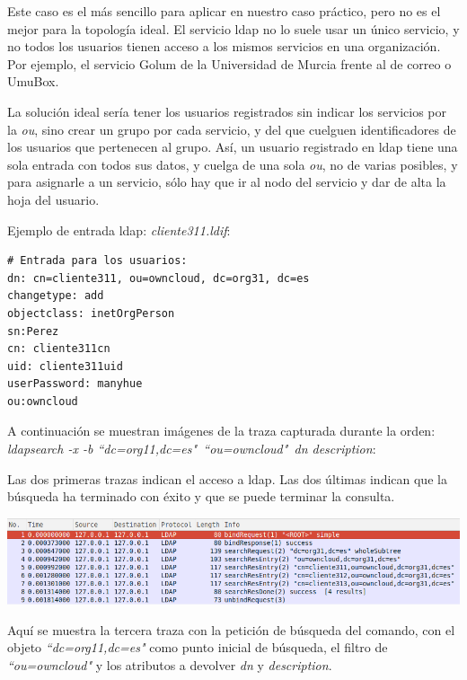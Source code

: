 \documentclass[]{article}
\begin{document}
Este caso es el más sencillo para aplicar en nuestro caso práctico, pero no es el mejor para la topología ideal. El servicio ldap no lo suele usar un único servicio, y no todos los usuarios tienen acceso a los mismos servicios en una organización. Por ejemplo, el servicio Golum de la Universidad de Murcia frente al de correo o UmuBox.

La solución ideal sería tener los usuarios registrados sin indicar los servicios por la \textit{ou}, sino crear un grupo por cada servicio, y del que cuelguen identificadores de los usuarios que pertenecen al grupo. Así, un usuario registrado en ldap tiene una sola entrada con todos sus datos, y cuelga de una sola \textit{ou}, no de varias posibles, y para asignarle a un servicio, sólo hay que ir al nodo del servicio y dar de alta la hoja del usuario.

Ejemplo de entrada ldap: \textit{cliente311.ldif}:

\begin{BVerbatim}
# Entrada para los usuarios:
dn: cn=cliente311, ou=owncloud, dc=org31, dc=es
changetype: add
objectclass: inetOrgPerson
sn:Perez
cn: cliente311cn
uid: cliente311uid
userPassword: manyhue
ou:owncloud
\end{BVerbatim}


A continuación se muestran imágenes de la traza capturada durante la orden: \textit{ldapsearch -x -b “dc=org11,dc=es"\ “ou=owncloud"\ dn description}:

Las dos primeras trazas indican el acceso a ldap. Las dos últimas indican que la búsqueda ha terminado con éxito y que se puede terminar la consulta.

\begin{center}
\includegraphics[scale=0.5]{images/ldap/ldap1}
\end{center}

Aquí se muestra la tercera traza con la petición de búsqueda del comando, con el objeto \textit{“dc=org11,dc=es"} como punto inicial de búsqueda, el filtro de \textit{“ou=owncloud"} y los atributos a devolver \textit{dn} y \textit{description}.
\end{document}
